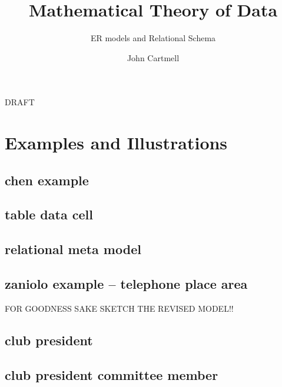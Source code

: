 \documentclass[10pt,a4paper]{scrartcl}
\begin{document}
\title{Mathematical Theory of Data}
\subtitle{ER models and Relational Schema}
\author{John Cartmell}
\maketitle
\begin{center}
DRAFT
\end{center}







\newpage
\appendix

\section{Examples and Illustrations}
\subsection{chen example}


\subsection{table data cell}


\subsection{relational meta model}


\subsection{zaniolo example -- telephone place area}

FOR GOODNESS SAKE SKETCH THE REVISED MODEL!!

\subsection{club president}


\subsection{club president committee member}

\end{document}
